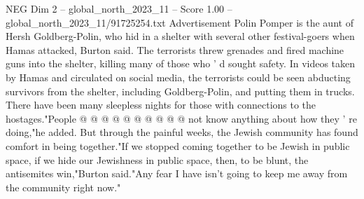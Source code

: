 \begin{textsample}{NEG Dim 2 – global\_north\_2023\_11 – Score 1.00 – global\_north\_2023\_11/91725254.txt}
Advertisement Polin Pomper is the aunt of Hersh Goldberg-Polin, who hid in a shelter with several other festival-goers when Hamas attacked, Burton said.
The terrorists threw grenades and fired machine guns into the shelter, killing many of those who ' d sought safety.
In videos taken by Hamas and circulated on social media, the terrorists could be seen abducting survivors from the shelter, including Goldberg-Polin, and putting them in trucks.
There have been many sleepless nights for those with connections to the hostages."People @ @ @ @ @ @ @ @ @ @ not know anything about how they ' re doing,"he added.
But through the painful weeks, the Jewish community has found comfort in being together."If we stopped coming together to be Jewish in public space, if we hide our Jewishness in public space, then, to be blunt, the antisemites win,"Burton said."Any fear I have isn't going to keep me away from the community right now."

\end{textsample}
